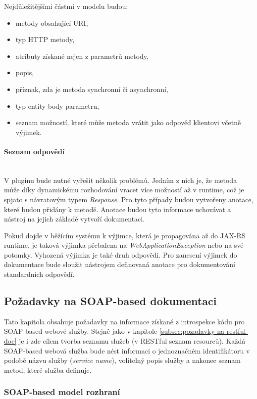 \documentclass[11pt,twoside,a4paper]{book}
\begin{document}
Nejdůležitějšími částmi v modelu budou:
\begin{itemize}
  \item metody obsahující URI,
  \item typ HTTP metody,
  \item atributy získané nejen z parametrů metody,
  \item popis,
  \item příznak, zda je metoda synchronní či asynchronní,
  \item typ entity body parametru,
  \item seznam možností, které může metoda vrátit jako odpověď klientovi včetně
  výjimek.
\end{itemize}

\paragraph{Seznam odpovědí}
\mbox{}\\

V pluginu bude nutné vyřešit několik problémů. Jedním z nich je, že metoda může díky
dynamickému rozhodování vracet více možností až v runtime, což je spjato s návratovým
typem {\em Response}. Pro tyto případy budou vytvořeny anotace, které budou přidány k metodě.
Anotace budou tyto informace uchovávat a nástroj na jejich základě vytvoří dokumentaci.

Pokud dojde v běžícím systému k výjimce, která je propagována až do JAX-RS runtime, je
taková výjimka přebalena na {\em WebApplicationException} nebo na své potomky.
Vyhozená výjimka je také druh odpovědi. Pro zanesení výjimek do dokumentace bude sloužit nástrojem
definovaná anotace pro dokumentování standardních odpovědí.

\subsection{Požadavky na SOAP-based dokumentaci}

Tato kapitola obsahuje požadavky na informace získané z introspekce kódu pro SOAP-based webové služby.
Stejně jako v kapitole \ref{subsec:pozadavky-na-restful-doc} je i zde 
cílem tvorba seznamu služeb (v RESTful seznam resourců). Každá SOAP-based webová
služba bude nést informaci o jednoznačném identifikátoru v podobě názvu služby
({\em service name}), volitelný popis služby a nakonec seznam metod, které
služba definuje.

\subsubsection{SOAP-based model rozhraní}
\label{subsec:soap-model-rozhrani}
\end{document}
